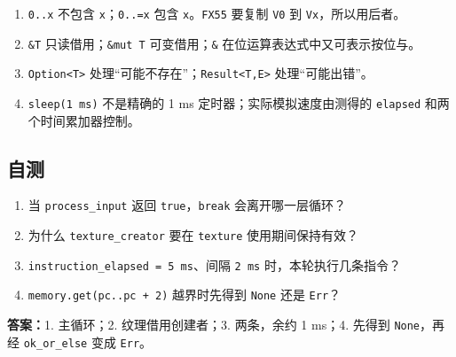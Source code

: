 \documentclass[UTF8,11pt,a4paper]{ctexart}
\begin{document}
\begin{enumerate}[label=\arabic*.]
  \item \texttt{0..x} 不包含 \texttt{x}；\texttt{0..=x} 包含 \texttt{x}。\texttt{FX55} 要复制 \texttt{V0} 到 \texttt{Vx}，所以用后者。
  \item \texttt{\&T} 只读借用；\texttt{\&mut T} 可变借用；\texttt{\&} 在位运算表达式中又可表示按位与。
  \item \texttt{Option<T>} 处理“可能不存在”；\texttt{Result<T,E>} 处理“可能出错”。
  \item \texttt{sleep(1 ms)} 不是精确的 1 ms 定时器；实际模拟速度由测得的 \texttt{elapsed} 和两个时间累加器控制。
\end{enumerate}

\subsection*{自测}

\begin{enumerate}[label=\arabic*.]
  \item 当 \texttt{process\_input} 返回 \texttt{true}，\texttt{break} 会离开哪一层循环？
  \item 为什么 \texttt{texture\_creator} 要在 \texttt{texture} 使用期间保持有效？
  \item \texttt{instruction\_elapsed = 5 ms}、间隔 \texttt{2 ms} 时，本轮执行几条指令？
  \item \texttt{memory.get(pc..pc + 2)} 越界时先得到 \texttt{None} 还是 \texttt{Err}？
\end{enumerate}

\textbf{答案：}1. 主循环；2. 纹理借用创建者；3. 两条，余约 1 ms；4. 先得到 \texttt{None}，再经 \texttt{ok\_or\_else} 变成 \texttt{Err}。
\end{document}
